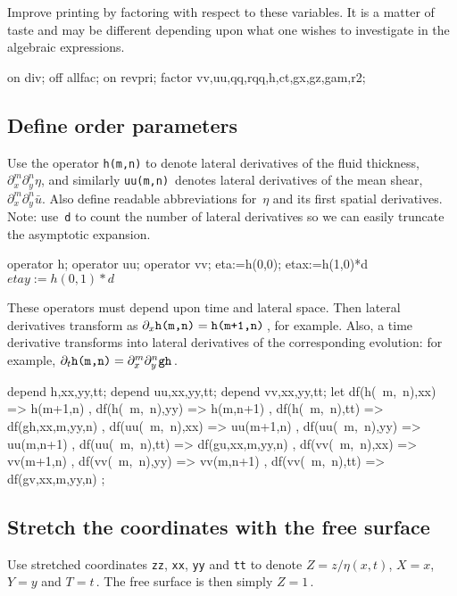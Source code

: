 \documentclass[12pt,a5paper]{article}
\newcommand{\uu}{{\bar u}}
\begin{document}
Improve printing by factoring with respect to these variables.  It is
a matter of taste and may be different depending upon what one wishes
to investigate in the algebraic expressions.

\begin{reduce}
on div; off allfac; on revpri; 
factor vv,uu,qq,rqq,h,ct,gx,gz,gam,r2;
\end{reduce}

\subsection{Define order parameters}

Use the operator \verb|h(m,n)| to denote lateral derivatives of the
fluid thickness,~$\partial_x^m\partial_y^n\eta$, and similarly \verb|uu(m,n)|~denotes
lateral derivatives of the mean shear,~$\partial_x^m\partial_y^n\uu$.  Also
define readable abbreviations for~$\eta$ and its first spatial
derivatives.  Note: use~\verb|d| to count the number of lateral
 derivatives so we can easily truncate the asymptotic expansion.

\begin{reduce}
operator h; operator uu; operator vv;
eta:=h(0,0); etax:=h(1,0)*d$ etay:=h(0,1)*d$
\end{reduce}

These operators must depend upon time and lateral space.  Then lateral
derivatives transform as $\partial_x\verb|h(m,n)|= \verb|h(m+1,n)|$\,, for
example.  Also, a time derivative transforms into lateral
derivatives of the corresponding evolution: for example,
$\partial_t\verb|h(m,n)|= \partial_x^m\partial_y^n\verb|gh|$\,.

\begin{reduce}
depend h,xx,yy,tt; 
depend uu,xx,yy,tt; 
depend vv,xx,yy,tt; 
let { df(h(~m,~n),xx) => h(m+1,n)
    , df(h(~m,~n),yy) => h(m,n+1)
    , df(h(~m,~n),tt) => df(gh,xx,m,yy,n)
    , df(uu(~m,~n),xx) => uu(m+1,n)
    , df(uu(~m,~n),yy) => uu(m,n+1)
    , df(uu(~m,~n),tt) => df(gu,xx,m,yy,n)
    , df(vv(~m,~n),xx) => vv(m+1,n)
    , df(vv(~m,~n),yy) => vv(m,n+1)
    , df(vv(~m,~n),tt) => df(gv,xx,m,yy,n) 
    };
\end{reduce}


\subsection{Stretch the coordinates with the free surface}

Use stretched coordinates \verb|zz|, \verb|xx|, \verb|yy| and \verb|tt| to denote
$Z=z/\eta(x,t)$, $X=x$, $Y=y$ and $T=t$\,.  The free surface is then
simply $Z=1$\,.
\end{document}
